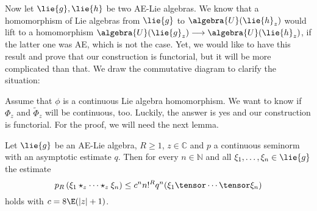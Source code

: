 Now let $\lie{g}, \lie{h}$ be two AE-Lie algebras. We know that a homomorphism 
of Lie algebras from $\lie{g}$ to $\algebra{U}(\lie{h}_z)$ would lift to a 
homomorphism $\algebra{U}(\lie{g}_z) \longrightarrow \algebra{U}(\lie{h}_z)$, 
if the latter one was AE, which is not the case. Yet, we would like to have 
this result and prove that our construction is functorial, but it will be 
more complicated than that. We draw the commutative diagram to clarify the 
situation:
\begin{center}
\end{center}
Assume that $\phi$ is a continuous Lie algebra homomorphism. We want to know if 
$\Phi_z$ and $\widetilde{\Phi}_z$ will be continuous, too. Luckily, the answer 
is yes and our construction is functorial. For the proof, we will need the 
next lemma.
\begin{lemma}
    \label{LCAna:Lemma:LemmaPreContinuityN}%
    Let $\lie{g}$ be an AE-Lie algebra, $R \geq 1$, $z \in \mathbb{C}$ and $p$ 
    a continuous seminorm with an asymptotic estimate $q$. Then for every $n 
    \in \mathbb{N}$ and all $\xi_1, \ldots, \xi_n \in \lie{g}$ the estimate
    \begin{equation}
        \label{LCAna:LemmaPreContinuityN}
        p_R \left(
            \xi_1 \star_z \cdots \star_z \xi_n
        \right)
        \leq
        c^n n!^R
        q^n(\xi_1 \tensor \cdots \tensor \xi_n)
    \end{equation}
    holds with $c = 8 \E (|z| + 1)$.
\end{lemma}
